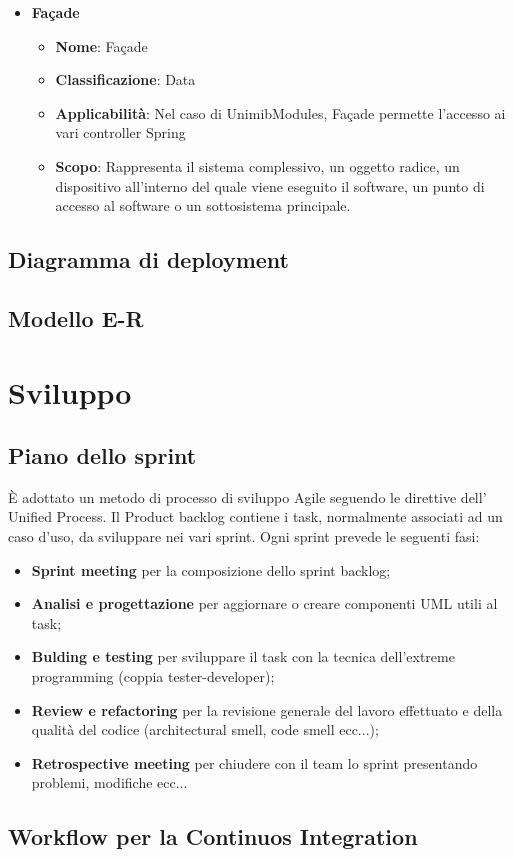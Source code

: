 \documentclass[12pt]{article}
\begin{document}
\begin{itemize}
		
		\item \textbf{Façade}
		\begin{itemize}
		\item \textbf{Nome}: Façade
            \item \textbf{Classificazione}: Data
            \item \textbf{Applicabilità}: Nel caso di UnimibModules, Façade permette l'accesso ai vari controller Spring
            \item \textbf{Scopo}: Rappresenta il sistema complessivo, un oggetto radice, un dispositivo all’interno del quale viene eseguito il software, un punto di accesso al software o un sottosistema principale.
        \end{itemize}
	\end{itemize}
\subsection{Diagramma di deployment}
\subsection{Modello E-R}
\section{Sviluppo}
\subsection{Piano dello sprint}
\`{E} adottato un metodo di processo di sviluppo Agile seguendo le direttive dell' Unified Process. Il Product backlog contiene i task, normalmente associati ad un caso d'uso,  da sviluppare nei vari sprint. Ogni sprint prevede le seguenti fasi:
\begin{itemize}
\item {\textbf {Sprint meeting}} per la composizione dello sprint backlog;
\item {\textbf {Analisi e progettazione}}  per aggiornare o creare componenti UML utili al task;
\item {\textbf {Bulding e testing}}  per sviluppare il task con la tecnica dell'extreme programming (coppia tester-developer);
\item {\textbf {Review e refactoring}} per la revisione generale del lavoro effettuato e della qualità del codice (architectural smell, code smell ecc...);
\item {\textbf {Retrospective meeting}} per chiudere con il team lo sprint presentando problemi, modifiche ecc...

\end{itemize}

\subsection{Workflow per la Continuos Integration}


\end{document}
